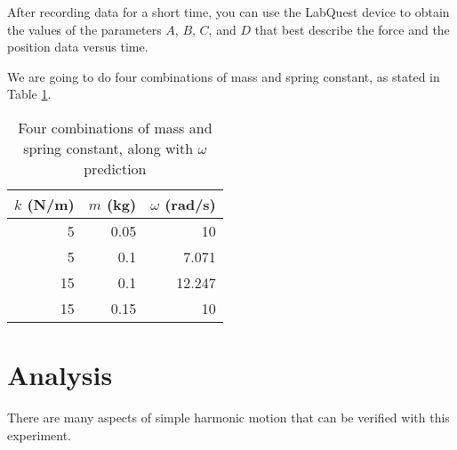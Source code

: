 After recording data for a short time, you can use the LabQuest device to obtain the values of the parameters $A$, $B$, $C$, and $D$ that best describe the force and the position data versus time.

We are going to do four combinations of mass and spring constant, as stated in Table \ref{table.11.parameters}.
\begin{table}
    \centering
    \begin{tabular}{|r|r|r|}\hline
        $k$ (N/m) & $m$ (kg) & $\omega$ (rad/s) \\ \hline
        5 & 0.05 & 10 \\
        5 & 0.1 & 7.071 \\
        15 & 0.1 & 12.247 \\
        15 & 0.15 & 10 \\
        \hline
    \end{tabular}
    \caption{Four combinations of mass and spring constant, along with $\omega$ prediction}
    \label{table.11.parameters}
\end{table}
\section{Analysis}
There are many aspects of simple harmonic motion that can be verified with this experiment.
